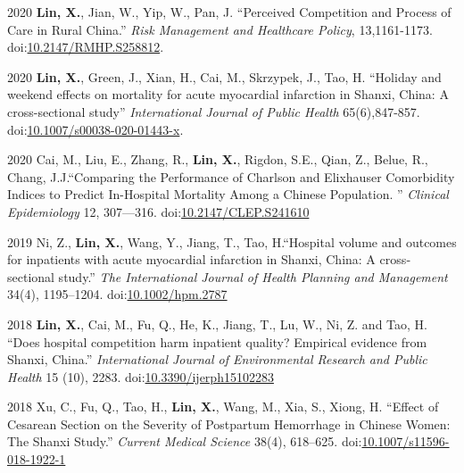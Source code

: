 \documentclass[12pt,letterpaper]{report}
\begin{document}
    \begin{tablist}
                
        \item[2020] \tab \textbf{Lin, X.}, Jian, W., Yip, W., Pan, J. \enquote{Perceived Competition and Process of Care in Rural China.} \textit{Risk Management and Healthcare Policy}, 13,1161-1173. doi:\href{https://doi.org/10.2147/RMHP.S258812}{10.2147/RMHP.S258812}. 
    
         \item[2020] \tab \textbf{Lin, X.}, Green, J., Xian, H., Cai, M., Skrzypek, J., Tao, H. \enquote{Holiday and weekend effects on mortality for acute myocardial infarction in Shanxi, China:  A cross-sectional study} \textit{International Journal of Public Health} 65(6),847-857. doi:\href{https://doi.org/10.1007/s00038-020-01443-x}{10.1007/s00038-020-01443-x}.
    	
    	\item[2020] \tab Cai, M., Liu, E., Zhang, R., \textbf{Lin, X.},  Rigdon, S.E., Qian, Z., Belue, R., Chang, J.J.\enquote{Comparing the Performance of Charlson and Elixhauser Comorbidity Indices to Predict In-Hospital Mortality Among a Chinese Population. } \textit{Clinical Epidemiology} 12, 307—316. doi:\href{https://doi.org/10.2147/CLEP.S241610}{10.2147/CLEP.S241610}
    	
    	\item[2019] \tab Ni, Z.,  \textbf{Lin, X.}, Wang, Y., Jiang, T., Tao, H.\enquote{Hospital volume and outcomes for inpatients with acute myocardial infarction in Shanxi, China: A cross‐sectional study.} \textit{The International Journal of Health Planning and Management} 34(4), 1195–1204. doi:\href{https://doi.org/10.1002/hpm.2787}{10.1002/hpm.2787}
    	
    	\item[2018] \tab \textbf{Lin, X.}, Cai, M., Fu, Q., He, K., Jiang, T., Lu, W., Ni, Z. and Tao, H. \enquote{Does hospital competition harm inpatient quality? Empirical evidence from Shanxi, China.} \textit{International Journal of Environmental Research and Public Health} 15 (10), 2283. doi:\href{https://doi.org/10.3390/ijerph15102283}{10.3390/ijerph15102283}
    	
    	\item[2018] \tab Xu, C., Fu, Q., Tao, H., \textbf{Lin, X.}, Wang, M., Xia, S., Xiong, H. \enquote{Effect of Cesarean Section on the Severity of Postpartum Hemorrhage in Chinese Women: The Shanxi Study.} \textit{Current Medical Science} 38(4), 618–625. doi:\href{https://doi.org/10.1007/s11596-018-1922-1}{10.1007/s11596-018-1922-1}
    	

\end{tablist}
\end{document}
